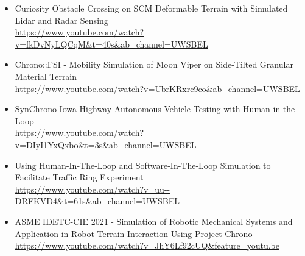 



\begin{footnotesize}

\begin{itemize}[leftmargin=2ex, nosep, noitemsep]
	
	
	\item {Curiosity Obstacle Crossing on SCM Deformable Terrain with Simulated Lidar and Radar Sensing \\ \url{https://www.youtube.com/watch?v=fkDvNyLQCqM&t=40s&ab_channel=UWSBEL}}
	
	
	\item {Chrono::FSI - Mobility Simulation of Moon Viper on Side-Tilted Granular Material Terrain \\ \url{https://www.youtube.com/watch?v=UbrKRxrc9co&ab_channel=UWSBEL}}
	
	
	
	
	\item {SynChrono Iowa Highway Autonomous Vehicle Testing with Human in the Loop \\ \url{https://www.youtube.com/watch?v=DIyI1YxQxbo&t=3s&ab_channel=UWSBEL}}
	
	
	\item {Using Human-In-The-Loop and Software-In-The-Loop Simulation to Facilitate Traffic Ring Experiment \\ \url{https://www.youtube.com/watch?v=uu--DRFKVD4&t=61s&ab_channel=UWSBEL}}
	
	
	\item {ASME IDETC-CIE 2021 - Simulation of Robotic Mechanical Systems and Application in Robot-Terrain Interaction Using Project Chrono \\ \url{	https://www.youtube.com/watch?v=JhY6Lf92cUQ&feature=youtu.be}}

\end{itemize}
	
\end{footnotesize}


